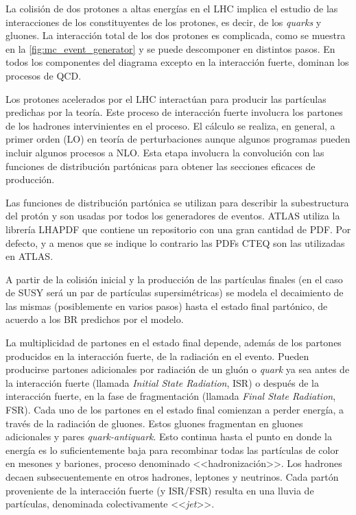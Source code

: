 La colisión de dos protones a altas energías en el LHC implica el estudio de las
interacciones de los constituyentes de los protones, es decir, de los \emph{quarks} y
gluones. La interacción total de los dos protones es complicada, como se muestra
en la \cref{fig:mc_event_generator} y se puede descomponer en distintos pasos.
En todos los componentes del diagrama excepto en la interacción fuerte, dominan los procesos de QCD.

Los protones acelerados por el LHC interactúan para producir las partículas
predichas por la teoría. Este proceso de interacción fuerte involucra los
partones de los hadrones intervinientes en el proceso. El cálculo se realiza, en
general, a primer orden (LO) en teoría de perturbaciones aunque algunos
programas pueden incluir algunos procesos a NLO. Esta etapa involucra la
convolución con las funciones de distribución partónicas para obtener las
secciones eficaces de producción.

Las funciones de distribución partónica se utilizan para describir la
subestructura del protón y son usadas por todos los generadores de eventos.
ATLAS utiliza la librería LHAPDF \cite{Bourilkov:2006cj} que contiene un
repositorio con una gran
cantidad de PDF. Por defecto, y a menos que se indique lo contrario las PDFs
CTEQ \cite{Nadolsky:2008zw} son las utilizadas en ATLAS.

A partir de la colisión inicial y la producción de las partículas finales (en el
caso de SUSY será un par de partículas supersimétricas) se
modela el decaimiento de las mismas (posiblemente en varios pasos) hasta el
estado final partónico, de acuerdo a los BR predichos por el modelo.

La multiplicidad de partones en el estado final depende, además de los partones producidos en la interacción
fuerte, de la radiación en el evento. Pueden producirse partones adicionales por
radiación de un gluón o \emph{quark} ya sea antes de la interacción fuerte (llamada
\emph{Initial State Radiation}, ISR) o después de la interacción fuerte, en la fase de
fragmentación (llamada \emph{Final State Radiation}, FSR).
Cada uno de los partones en el estado
final comienzan a perder energía, a través de la radiación de gluones. Estos
gluones fragmentan en gluones adicionales y pares \emph{quark-antiquark}. Esto continua
hasta el punto en donde la energía es lo suficientemente baja para recombinar
todas las partículas de color en mesones y bariones, proceso denominado
<<hadronización>>. Los hadrones decaen subsecuentemente en otros hadrones,
leptones y neutrinos. Cada partón proveniente de la interacción fuerte (y
ISR/FSR) resulta en una lluvia de partículas, denominada colectivamente
<<\emph{jet}>>.


